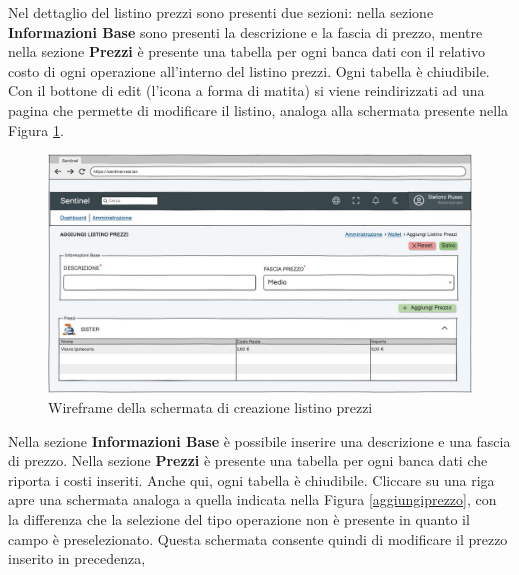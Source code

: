 Nel dettaglio del listino prezzi sono presenti due sezioni: nella sezione \textbf{Informazioni Base} sono presenti la descrizione e la fascia di prezzo, mentre nella sezione
\textbf{Prezzi} \`e presente una tabella per ogni banca dati con il relativo costo di ogni operazione all'interno del listino prezzi. Ogni tabella \`e chiudibile.
Con il bottone di edit (l'icona a forma di matita) si viene reindirizzati ad una pagina che permette di modificare il listino, analoga alla schermata presente nella Figura \ref{aggiungilistino}.

\begin{figure}[H]
  \centering
  \includegraphics[width=13cm]{images/gestione-listini/add-listino.png}
  \caption{Wireframe della schermata di creazione listino prezzi}
  \label{aggiungilistino}
\end{figure}
Nella sezione \textbf{Informazioni Base} \`e possibile inserire una descrizione e una fascia di prezzo.
Nella sezione \textbf{Prezzi} \`e presente una tabella per ogni banca dati che riporta i costi inseriti. Anche qui, ogni tabella \`e chiudibile.
Cliccare su una riga apre una schermata analoga a quella indicata nella Figura \ref{aggiungiprezzo}, con la differenza che la selezione del tipo operazione
non \`e presente in quanto il campo \`e preselezionato. Questa schermata consente quindi di modificare il prezzo inserito in precedenza,


